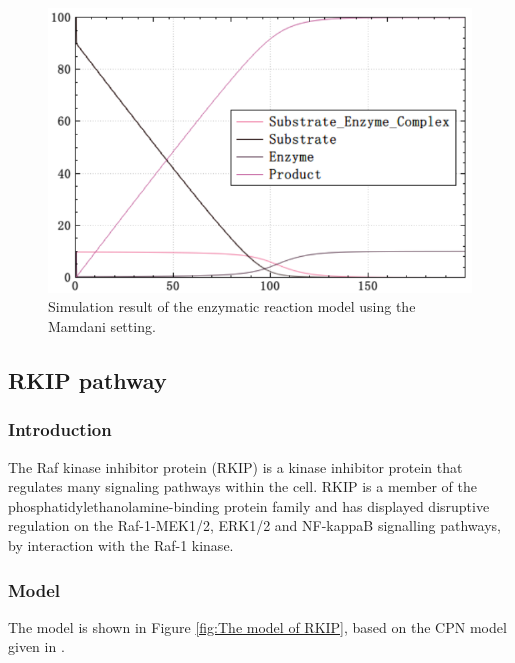 \documentclass[journal,a4paper,onecolumn]{article}
\begin{document}
\begin{figure}[!hbt]
	\begin{center}
		\includegraphics[width=\columnwidth]{fig27}
		\caption{Simulation result of the enzymatic reaction model using the Mamdani setting.}
		\label{fig:Simulation result of enzyme using Mamdani.}
	\end{center}
\end{figure}





\clearpage
\subsection{RKIP pathway}

\subsubsection{Introduction}

The Raf kinase inhibitor protein (RKIP) \cite{CSK+03} is a kinase inhibitor protein that regulates many signaling pathways within the cell. RKIP is a member of the phosphatidylethanolamine-binding protein family and has displayed disruptive regulation on the Raf-1-MEK1/2, ERK1/2 and NF-kappaB signalling pathways, by interaction with the Raf-1 kinase. 

\subsubsection{Model}
The model is shown in Figure \ref{fig:The model of RKIP}, based on the CPN model given in \cite{GH06}.
\end{document}
